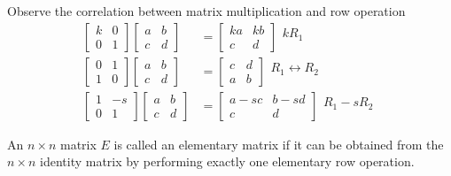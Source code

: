 \documentclass[english, 12pt]{article}
\begin{document}
\begin{note}
Observe the correlation between matrix multiplication and row operation
\begin{align*}
\begin{bmatrix} k & 0 \\ 0 & 1 \end{bmatrix} \begin{bmatrix} a & b \\ c & d \end{bmatrix} &= \begin{bmatrix} ka & kb \\ c & d \end{bmatrix} \begin{matrix} kR_1 \\ ~ \end{matrix} \\
\begin{bmatrix} 0 & 1 \\ 1 & 0 \end{bmatrix} \begin{bmatrix} a & b \\ c & d \end{bmatrix} &= \begin{bmatrix} c & d \\ a & b \end{bmatrix} \begin{matrix} R_1 \leftrightarrow R_2 \\ ~ \end{matrix} \\
\begin{bmatrix} 1 & -s \\ 0 & 1 \end{bmatrix} \begin{bmatrix} a & b \\ c & d \end{bmatrix} &= \begin{bmatrix} a -sc & b - sd \\ c & d \end{bmatrix} \begin{matrix} R_1 - sR_2 \\ ~ \end{matrix}
\end{align*}
\end{note}

\begin{defn}
An $n \times n$ matrix $E$ is called an elementary matrix if it can be obtained from the $n \times n$ identity matrix by performing exactly one elementary row operation.
\end{defn}
\end{document}
